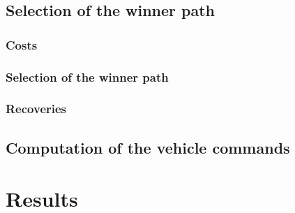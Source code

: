 \subsection{Selection of the winner path}\label{ch:chapter07_01_04}
\subsubsection{Costs}\label{ch:chapter07_01_04_01}
\subsubsection{Selection of the winner path}\label{ch:chapter07_01_04_02}
\subsubsection{Recoveries}\label{ch:chapter07_01_04_03}
\subsection{Computation of the vehicle commands}\label{ch:chapter07_01_05}
\section{Results}\label{ch:chapter07_02}


  
% 
% 
% 




